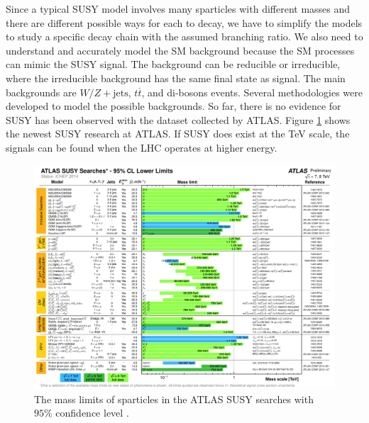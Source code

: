 \documentclass[12pt]{report}
\begin{document}
Since a typical SUSY model involves many sparticles with different masses and there are different possible ways for each to decay, we have to simplify the models to study a specific decay chain with the assumed branching ratio.
We also need to understand and accurately model the SM background because the SM processes can mimic the SUSY signal.
The background can be reducible or irreducible, where the irreducible background has the same final state as signal.
The main backgrounds are $W/Z + \mathrm{jets}$, $t \overline{t}$, and di-bosons events.
Several methodologies were developed to model the possible backgrounds.
So far, there is no evidence for SUSY has been observed with the dataset collected by ATLAS.
Figure \ref{fig: ATLAS_SUSY_Summary} shows the newest SUSY research at ATLAS.
If SUSY does exist at the TeV scale, the signals can be found when the LHC operates at higher energy.
\begin{figure}[htbp]
\begin{center}
\includegraphics[scale=0.6]{figures/ATLAS_SUSY_Summary.pdf}
\caption{The mass limits of sparticles in the ATLAS SUSY searches with $95\%$ confidence level \cite{atlas_results}.} %
\label{fig: ATLAS_SUSY_Summary}
\end{center}
\end{figure}
\end{document}
